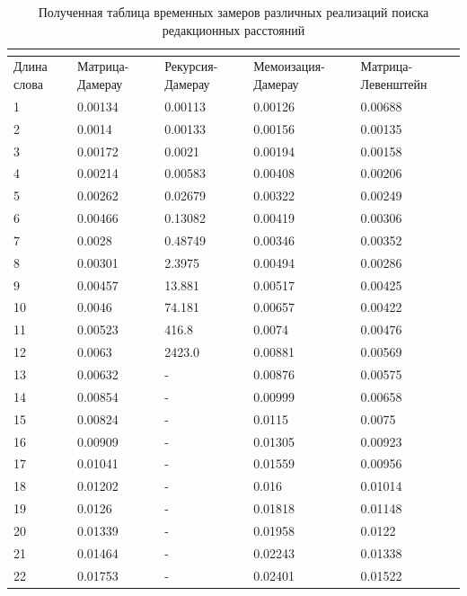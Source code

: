 \begin{tiny}
    \begin{longtable}{|l|l|l|l|l|}
        \caption{Полученная таблица временных замеров различных реализаций поиска редакционных расстояний}\\
        \label{t:timings}\\
        \hline
        Длина слова & Матрица-Дамерау & Рекурсия-Дамерау & Мемоизация-Дамерау & Матрица-Левенштейн \\ \hline
        1 & 0.00134 & 0.00113 & 0.00126 & 0.00688 \\ \hline
        2 & 0.0014 & 0.00133 & 0.00156 & 0.00135 \\ \hline
        3 & 0.00172 & 0.0021 & 0.00194 & 0.00158 \\ \hline
        4 & 0.00214 & 0.00583 & 0.00408 & 0.00206 \\ \hline
        5 & 0.00262 & 0.02679 & 0.00322 & 0.00249 \\ \hline
        6 & 0.00466 & 0.13082 & 0.00419 & 0.00306 \\ \hline
        7 & 0.0028 & 0.48749 & 0.00346 & 0.00352 \\ \hline
        8 & 0.00301 & 2.3975 & 0.00494 & 0.00286 \\ \hline
        9 & 0.00457 & 13.881 & 0.00517 & 0.00425 \\ \hline
        10 & 0.0046 & 74.181 & 0.00657 & 0.00422 \\ \hline
        11 & 0.00523 & 416.8 & 0.0074 & 0.00476 \\ \hline
        12 & 0.0063 & 2423.0 & 0.00881 & 0.00569 \\ \hline
        13 & 0.00632 & - & 0.00876 & 0.00575 \\ \hline
        14 & 0.00854 & - & 0.00999 & 0.00658 \\ \hline
        15 & 0.00824 & - & 0.0115 & 0.0075 \\ \hline
        16 & 0.00909 & - & 0.01305 & 0.00923 \\ \hline
        17 & 0.01041 & - & 0.01559 & 0.00956 \\ \hline
        18 & 0.01202 & - & 0.016 & 0.01014 \\ \hline
        19 & 0.0126 & - & 0.01818 & 0.01148 \\ \hline
        20 & 0.01339 & - & 0.01958 & 0.0122 \\ \hline
        21 & 0.01464 & - & 0.02243 & 0.01338 \\ \hline
        22 & 0.01753 & - & 0.02401 & 0.01522 \\ \hline

\end{longtable}
\end{tiny}
